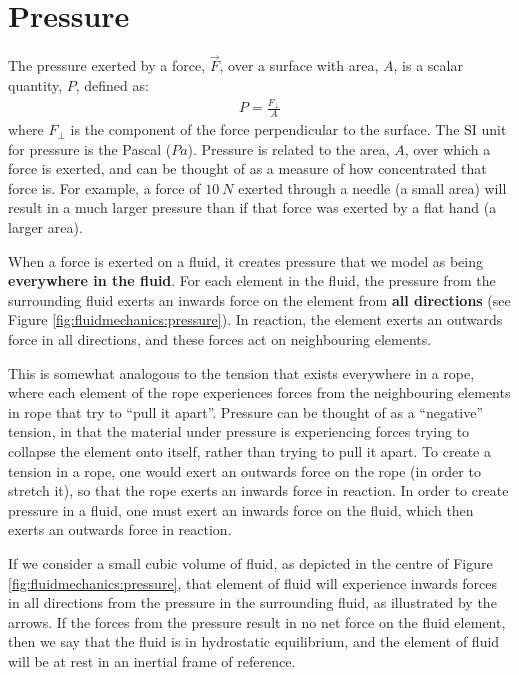 \section{Pressure}
The pressure exerted by a force, $\vec F$, over a surface with area, $A$, is a scalar quantity, $P$, defined as:
\begin{align*}
P=\frac{F_\perp}{A}
\end{align*}
where $F_\perp$ is the component of the force perpendicular to the surface. The SI unit for pressure is the Pascal ($\si{Pa}$). Pressure is related to the area, $A$, over which a force is exerted, and can be thought of as a measure of how concentrated that force is. For example, a force of $\SI{10}{N}$ exerted through a needle (a small area) will result in a much larger pressure than if that force was exerted by a flat hand (a larger area). 


When a force is exerted on a fluid, it creates pressure that we model as being \textbf{everywhere in the fluid}.
For each element in the fluid, the pressure from the surrounding fluid exerts an inwards force on the element from \textbf{all directions} (see Figure \ref{fig:fluidmechanics:pressure}). In reaction, the element exerts an outwards force in all directions, and these forces act on neighbouring elements. 

This is somewhat analogous to the tension that exists everywhere in a rope, where each element of the rope experiences forces from the neighbouring elements in rope that try to ``pull it apart''. Pressure can be thought of as a ``negative'' tension, in that the material under pressure is experiencing forces trying to collapse the element onto itself, rather than trying to pull it apart. To create a tension in a rope, one would exert an outwards force on the rope (in order to stretch it), so that the rope exerts an inwards force in reaction. In order to create pressure in a fluid, one must exert an inwards force on the fluid, which then exerts an outwards force in reaction.

If we consider a small cubic volume of fluid, as depicted in the centre of Figure \ref{fig:fluidmechanics:pressure}, that element of fluid will experience inwards forces in all directions from the pressure in the surrounding fluid, as illustrated by the arrows. If the forces from the pressure result in no net force on the fluid element, then we say that the fluid is in hydrostatic equilibrium, and the element of fluid will be at rest in an inertial frame of reference.

